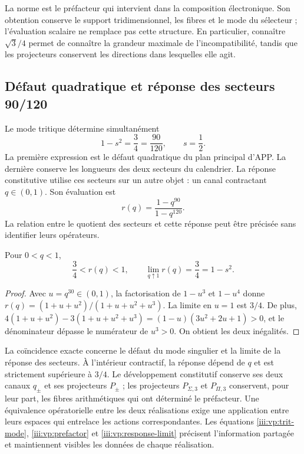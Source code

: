 La norme est le préfacteur qui intervient dans la composition électronique.
Son obtention conserve le support tridimensionnel, les fibres et le mode
du sélecteur ; l’évaluation scalaire ne remplace pas cette structure. En
particulier, connaître $\sqrt3/4$ permet de connaître la grandeur maximale de
l’incompatibilité, tandis que les projecteurs conservent les directions
dans lesquelles elle agit.

\clearpage
\subsection{Défaut quadratique et réponse des secteurs 90/120}

Le mode tritique détermine simultanément
\begin{equation}
 1-s^2=\frac34=\frac{90}{120},\qquad s=\frac12.
 \label{iii:vp:defect-ratio}
\end{equation}
La première expression est le défaut quadratique du plan principal d'APP. La dernière conserve les longueurs des deux secteurs du calendrier. La réponse constitutive utilise ces secteurs sur un autre objet : un canal contractant $q\in(0,1)$. Son évaluation est
\[
 r(q)=\frac{1-q^{90}}{1-q^{120}}.
\]
La relation entre le quotient des secteurs et cette réponse peut être
précisée sans identifier leurs opérateurs.

\begin{proposition}
Pour $0<q<1$,
\begin{equation}
 \frac34<r(q)<1,\qquad
 \lim_{q\uparrow1}r(q)=\frac34=1-s^2.
 \label{iii:vp:response-limit}
\end{equation}
\end{proposition}
\begin{proof}
Avec $u=q^{30}\in(0,1)$, la factorisation de $1-u^3$ et
$1-u^4$ donne
$r(q)=(1+u+u^2)/(1+u+u^2+u^3)$. La limite en $u=1$ est
$3/4$. De plus,
$4(1+u+u^2)-3(1+u+u^2+u^3)
=(1-u)(3u^2+2u+1)>0$, et le dénominateur dépasse le numérateur
de $u^3>0$. On obtient les deux inégalités.
\end{proof}

La coïncidence exacte concerne le défaut du mode singulier et la limite
de la réponse des secteurs. À l’intérieur contractif, la réponse
dépend de $q$ et est strictement supérieure à $3/4$. Le développement
constitutif conserve ses deux canaux $q_\pm$ et ses projecteurs
$P_\pm$ ; les projecteurs $P_{\Sigma,3}$ et $P_{\Pi,3}$ conservent,
pour leur part, les fibres arithmétiques qui ont déterminé le préfacteur.
Une équivalence opératorielle entre les deux réalisations exige une application
entre leurs espaces qui entrelace les actions correspondantes.
Les équations \eqref{iii:vp:trit-mode}, \eqref{iii:vp:prefactor} et
\eqref{iii:vp:response-limit} précisent l’information partagée et
maintiennent visibles les données de chaque réalisation.
